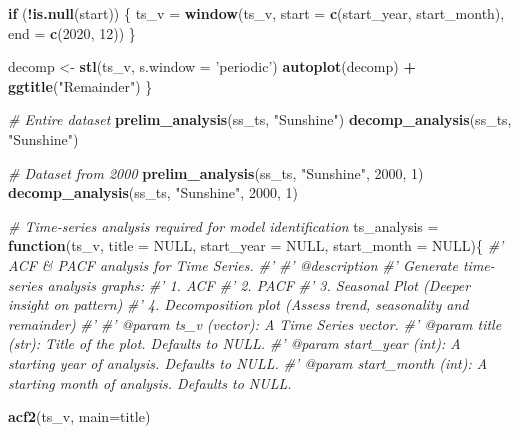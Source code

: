 \documentclass[
  11pt,
]{article}
\newenvironment{Shaded}{\begin{snugshade}}{\end{snugshade}}
\newcommand{\CommentTok}[1]{\textcolor[rgb]{0.56,0.35,0.01}{\textit{#1}}}
\newcommand{\ControlFlowTok}[1]{\textcolor[rgb]{0.13,0.29,0.53}{\textbf{#1}}}
\newcommand{\DataTypeTok}[1]{\textcolor[rgb]{0.13,0.29,0.53}{#1}}
\newcommand{\DecValTok}[1]{\textcolor[rgb]{0.00,0.00,0.81}{#1}}
\newcommand{\KeywordTok}[1]{\textcolor[rgb]{0.13,0.29,0.53}{\textbf{#1}}}
\newcommand{\NormalTok}[1]{#1}
\newcommand{\OperatorTok}[1]{\textcolor[rgb]{0.81,0.36,0.00}{\textbf{#1}}}
\newcommand{\OtherTok}[1]{\textcolor[rgb]{0.56,0.35,0.01}{#1}}
\newcommand{\StringTok}[1]{\textcolor[rgb]{0.31,0.60,0.02}{#1}}
\begin{document}
\begin{Shaded}
\begin{Highlighting}[]
  \ControlFlowTok{if}\NormalTok{ (}\OperatorTok{!}\KeywordTok{is.null}\NormalTok{(start)) \{}
\NormalTok{    ts_v =}\StringTok{ }\KeywordTok{window}\NormalTok{(ts_v,}
                \DataTypeTok{start =} \KeywordTok{c}\NormalTok{(start_year, start_month),}
                \DataTypeTok{end =} \KeywordTok{c}\NormalTok{(}\DecValTok{2020}\NormalTok{, }\DecValTok{12}\NormalTok{))}
\NormalTok{  \}}
  
\NormalTok{  decomp <-}\StringTok{ }\KeywordTok{stl}\NormalTok{(ts_v, }\DataTypeTok{s.window =} \StringTok{'periodic'}\NormalTok{)}
  \KeywordTok{autoplot}\NormalTok{(decomp) }\OperatorTok{+}\StringTok{  }\KeywordTok{ggtitle}\NormalTok{(}\StringTok{"Remainder"}\NormalTok{)}
\NormalTok{\}}

\CommentTok{# Entire dataset}
\KeywordTok{prelim_analysis}\NormalTok{(ss_ts, }\StringTok{"Sunshine"}\NormalTok{)}
\KeywordTok{decomp_analysis}\NormalTok{(ss_ts, }\StringTok{"Sunshine"}\NormalTok{)}

\CommentTok{# Dataset from 2000}
\KeywordTok{prelim_analysis}\NormalTok{(ss_ts, }\StringTok{"Sunshine"}\NormalTok{, }\DecValTok{2000}\NormalTok{, }\DecValTok{1}\NormalTok{)}
\KeywordTok{decomp_analysis}\NormalTok{(ss_ts, }\StringTok{"Sunshine"}\NormalTok{, }\DecValTok{2000}\NormalTok{, }\DecValTok{1}\NormalTok{)}

\CommentTok{# Time-series analysis required for model identification}
\NormalTok{ts_analysis =}\StringTok{ }\ControlFlowTok{function}\NormalTok{(ts_v,}
                       \DataTypeTok{title =} \OtherTok{NULL}\NormalTok{,}
                       \DataTypeTok{start_year =} \OtherTok{NULL}\NormalTok{,}
                       \DataTypeTok{start_month =} \OtherTok{NULL}\NormalTok{)\{}
  \CommentTok{#' ACF & PACF analysis for Time Series.}
  \CommentTok{#' }
  \CommentTok{#' @description}
  \CommentTok{#' Generate time-series analysis graphs:}
  \CommentTok{#' 1. ACF}
  \CommentTok{#' 2. PACF}
  \CommentTok{#' 3. Seasonal Plot (Deeper insight on pattern)}
  \CommentTok{#' 4. Decomposition plot (Assess trend, seasonality and remainder)}
  \CommentTok{#'}
  \CommentTok{#' @param ts_v (vector): A Time Series vector.}
  \CommentTok{#' @param title (str): Title of the plot. Defaults to NULL.}
  \CommentTok{#' @param start_year (int): A starting year of analysis. Defaults to NULL.}
  \CommentTok{#' @param start_month (int): A starting month of analysis. Defaults to NULL.}
  
  
  \KeywordTok{acf2}\NormalTok{(ts_v, }\DataTypeTok{main=}\NormalTok{title)}
  

\end{Highlighting}
\end{Shaded}
\end{document}
